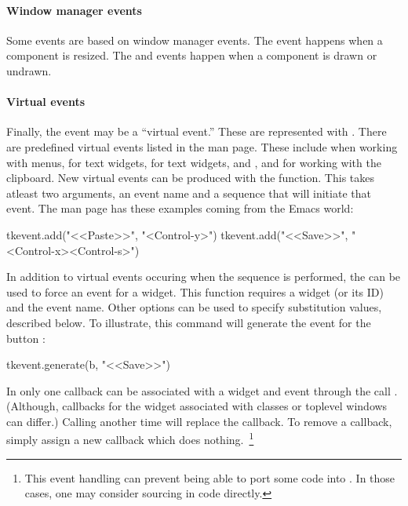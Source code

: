 \paragraph{Window manager events}
Some events are based on window manager events. The 
event happens when a component is resized. The  and
 events happen when a component is drawn or undrawn.

\paragraph{Virtual events}
Finally, the event may be a ``virtual event.'' These are represented with . There are predefined virtual events listed in the  man page. These include  when working with menus,   for text widgets,  for text widgets, and ,  and  for working with the clipboard. New virtual events can be produced with the  function. This takes atleast two arguments, an event name and a sequence that will initiate that event. The  man page has these examples coming from the Emacs world:
\begin{Schunk}
\begin{Sinput}
  tkevent.add("<<Paste>>", "<Control-y>")
  tkevent.add("<<Save>>", "<Control-x><Control-s>")
\end{Sinput}
\end{Schunk}
In addition to virtual events occuring when the sequence is performed, the  can be used to force an event for a widget. This function requires a widget (or its ID) and the event name. Other options can be used to specify substitution values, described below. To illustrate, this command will generate the  event for the button :
\begin{Schunk}
\begin{Sinput}
 tkevent.generate(b, "<<Save>>")
\end{Sinput}
\end{Schunk}



In  only one callback can be associated with a widget and event through the call . (Although, callbacks for the widget associated with classes or toplevel windows can differ.) Calling  another time will replace the callback. To remove a callback, simply assign a new callback which does nothing.~\footnote{This event handling can prevent being able to port some \Tk\/ code into . In those cases, one may consider sourcing in \Tcl\/ code directly.}



